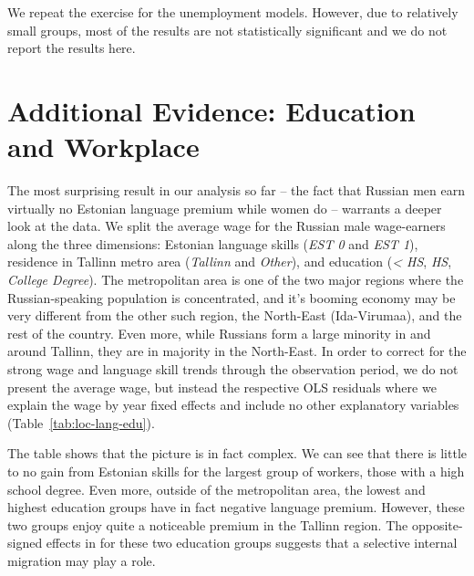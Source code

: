 \documentclass[12pt, a4paper]{article}
\begin{document}
We repeat the exercise for the unemployment models.
However, due to relatively small groups, most of the results are not
statistically significant and we
do not report the results here.



\section{Additional Evidence: Education and Workplace}
\label{sec:segregation-analysis}

The most surprising result in our analysis so far -- the fact that
Russian men earn virtually no Estonian language premium while women do -- warrants a
deeper look at the data.  We split the average wage for the Russian male wage-earners
along the three
dimensions: Estonian language skills (\emph{EST 0} and \emph{EST 1}),
residence in Tallinn metro area (\emph{Tallinn} and \emph{Other}),
and education (\emph{< HS}, \emph{HS}, \emph{College Degree}).  The metropolitan area is one of the two major regions
where the Russian-speaking population is concentrated, and it's
booming economy may be very different from the other such region, the
North-East (Ida-Virumaa), and the rest of the country.
Even more, while Russians form a large minority in and around Tallinn,
they are in majority in the North-East.  
In order to correct for the strong wage and language skill trends
through the observation period, we do not present the average wage,
but instead the respective OLS residuals where we explain the wage by year fixed
effects and include no other explanatory variables (Table~\ref{tab:loc-lang-edu}). 

The table shows that the picture is in fact complex.  We can see
that there is little to no gain from Estonian skills for the
largest group of workers, those with a high school degree.  Even more, outside of
the metropolitan area, the lowest and highest education groups
have in fact negative language premium.  However, these two groups
enjoy quite a noticeable premium in the Tallinn region.  The
opposite-signed effects in for these two education groups suggests
that a
selective internal migration may play a role.
\end{document}
